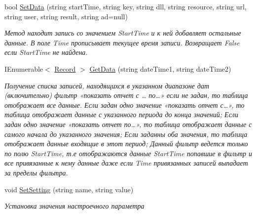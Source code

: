 \begin{DoxyCompactItemize}
\item 
bool \hyperlink{class_advert_data_1_1_database_a1035e18ac4389569bc236236f850d9c3}{Set\+Data} (string start\+Time, string key, string dll, string resource, string url, string user, string result, string ad=null)
\begin{DoxyCompactList}\small\item\em Метод находит запись со значением Start\+Time и к ней добавляет остальные данные. В поле Time прописывает текущее время записи. Возвращает False если Start\+Time не найдена. \end{DoxyCompactList}\item 
I\+Enumerable$<$ \hyperlink{class_advert_data_1_1_record}{Record} $>$ \hyperlink{class_advert_data_1_1_database_a31db3b29faa658c6b559c8a02d2d683d}{Get\+Data} (string date\+Time1, string date\+Time2)
\begin{DoxyCompactList}\small\item\em Получение списка записей, находящихся в указанном диапазоне дат (включительно) фильтр «показать отчет с … по…» если не задан, то таблица отображает все данные. Если задан одно значение «показать отчет с…», то таблица отображает данные с указанного периода до конца значений; Если задан одно значение «показать отчет по…», то таблица отображает данные с самого начала до указанного значения; Если заданны оба значения, то таблица отображает данные входящие в этот период; Данный фильтр ведется только по полю Start\+Time, т.\+е отображаются данные Start\+Time попавшие в фильтр и все привязанные к нему данные даже если Time привязанных записей выпадает за пределы фильтра. \end{DoxyCompactList}\item 
void \hyperlink{class_advert_data_1_1_database_a1f0ff57f6d508514c5aaf02dca134de3}{Set\+Setting} (string name, string value)
\begin{DoxyCompactList}\small\item\em Установка значения настроечного параметра \end{DoxyCompactList}\end{DoxyCompactItemize}
